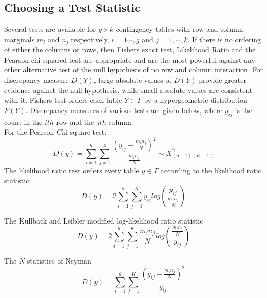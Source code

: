 \documentclass[12pt,oneside]{report}
\theoremstyle{definition}
\theoremstyle{mystyle}
\begin{document}
\subsection{Choosing a Test Statistic}
Several tests are available for $g \times k$ contingency tables with row  and column marginals $m_{i}$ and $n_{j}$ respectively,  $i=1\cdots,g$ and $j=1,\cdots,k$. If there is no  ordering of either the columns or rows, then Fishers exact test, Likelihood Ratio and the Pearson chi-squared test are appropriate and are the most powerful against any other alternative test of the null hypothesis of no row and column interaction. For discrepancy measure $D(Y)$, large absolute values of $D(Y)$ provide greater evidence against the null hypothesis, while small absolute values are consistent with it.
Fishers test orders each table $Y \in \Gamma$ by a hypergeometric distribution $P(Y)$. Discrepancy measures of various tests are given below, where $y_{ij}$ is the count in the $ith$ row and the $jth$ column:\\
For the Pearson Chi-square test:\\
\begin{equation}
D(y)=\sum\limits_{i=1}^{g}\sum\limits_{j=1}^{K}\frac{(y_{ij}-\frac{m_{i}n_{j}}{N})^2}{\frac{m_{i}n_{j}}{N}} \sim X^{2}_{(g-1)(K-1)}
\end{equation}
The likelihood ratio test orders every table $ y \in \Gamma$ according to the likelihood ratio statistic:\\
\begin{equation}
D(y)=2 \sum\limits_{i=1}^{g}\sum\limits_{j=1}^{K} y_{ij}log \left(\frac{y_{ij}}{\frac{m_{i}n_{j}}{N}}  \right)
\end{equation}

\vspace{5mm}

The Kullback and Leibler  modified log-likelihood ratio statistic
\begin{equation}
D(y)=2 \sum\limits_{i=1}^{g}\sum\limits_{j=1}^{K} \frac{m_{i}n_{j}}{N}log \left(\frac{\frac{m_{i}n_{j}}{N}}{y_{ij}}  \right)
\end{equation}

\vspace{5mm}

The $N$ statistics of Neyman
\begin{equation}
D(y)=\sum\limits_{i=1}^{g}\sum\limits_{j=1}^{K}\frac{(y_{ij}-\frac{m_{i}n_{j}}{N})^2}{y_{ij}} 
\end{equation}

\vspace{5mm}
\end{document}
